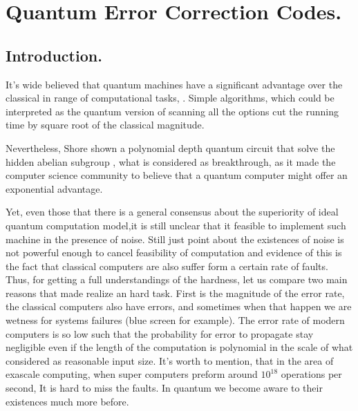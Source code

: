 \chapter{Quantum Error Correction Codes.}
\section{Introduction.}
It's wide believed that quantum machines have a significant advantage over the classical in range of computational tasks\cite{grover1996fast}, \cite{ahuja1999quantum}. Simple algorithms, which could be interpreted as the quantum version of scanning all the options cut the running time by square root of the classical magnitude. 

Nevertheless, Shore shown a polynomial depth quantum circuit that solve the hidden abelian subgroup \cite{Shor_1997}, what is considered as breakthrough, as it made the computer science community to believe that a quantum computer might offer an exponential advantage.

Yet, even those that there is a general consensus about the superiority of ideal quantum computation model,it is still unclear that it feasible to implement such machine in the presence of noise.   
Still just point about the existences of noise is not powerful enough to cancel feasibility of computation and evidence of this is the fact that classical computers are also suffer form a certain rate of faults. Thus, for getting a full understandings of the hardness, let us compare two main reasons that made realize an hard task. 
First is the magnitude of the error rate, the classical computers also have errors, and sometimes when that happen we are wetness for systems failures (blue screen for example). The error rate of modern computers is so low such that the probability for error to propagate stay negligible even if the length of the computation is polynomial in the scale of what considered as reasonable input size. It's worth to mention, that in the area of exascale computing, when super computers preform around $10^{18}$ operations per second, It is hard to miss the faults. In quantum we become aware to their existences much more before.      

